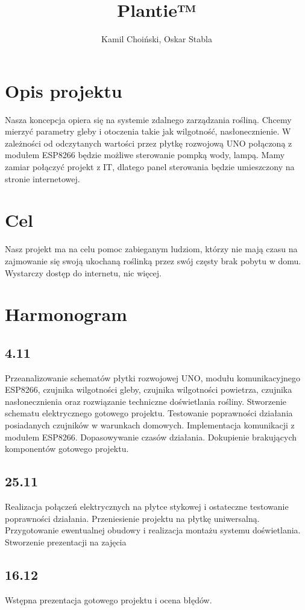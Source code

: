 \documentclass{article}
\begin{document}
\title{Plantie™}
\author{Kamil Choiński, Oskar Stabla}
\maketitle

\section{Opis projektu}
Nasza koncepcja opiera się na systemie zdalnego zarządzania rośliną.
Chcemy mierzyć parametry gleby i otoczenia takie jak wilgotność, nasłonecznienie.
W zależności od odczytanych wartości przez płytkę rozwojową UNO połączoną z modułem ESP8266 będzie możliwe sterowanie pompką wody, lampą.
Mamy zamiar połączyć projekt z IT, dlatego panel sterowania będzie umieszczony na stronie internetowej.
\section{Cel}
Nasz projekt ma na celu pomoc zabieganym ludziom, którzy nie mają czasu na zajmowanie się swoją ukochaną roślinką przez swój częsty brak pobytu w domu. Wystarczy dostęp do internetu, nic więcej.
\section{Harmonogram}
\subsection{4.11}
Przeanalizowanie schematów płytki rozwojowej UNO, modułu komunikacyjnego ESP8266, czujnika wilgotności gleby, czujnika wilgotności powietrza, czujnika nasłonecznienia oraz rozwiązanie techniczne doświetlania rośliny.  Stworzenie schematu elektrycznego gotowego projektu. Testowanie poprawności działania posiadanych czujników w warunkach domowych. Implementacja komunikacji z modułem ESP8266. Dopasowywanie czasów działania. 
Dokupienie brakujących komponentów gotowego projektu. 
\subsection{25.11}
Realizacja połączeń elektrycznych na płytce stykowej i ostateczne testowanie poprawności działania. Przeniesienie projektu na płytkę uniwersalną. Przygotowanie ewentualnej obudowy i realizacja montażu systemu doświetlania. Stworzenie prezentacji na zajęcia
\subsection{16.12}
Wstępna prezentacja gotowego projektu i ocena błędów.
\end{document}
